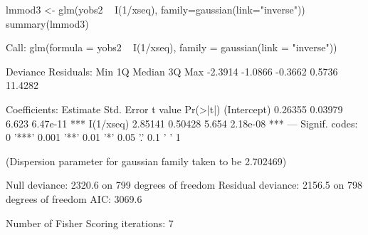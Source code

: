 \begin{Schunk}
\begin{Sinput}
 lmmod3 <- glm(yobs2 ~ I(1/xseq), family=gaussian(link="inverse"))
 summary(lmmod3)
\end{Sinput}
\begin{Soutput}
Call:
glm(formula = yobs2 ~ I(1/xseq), family = gaussian(link = "inverse"))

Deviance Residuals: 
    Min       1Q   Median       3Q      Max  
-2.3914  -1.0866  -0.3662   0.5736  11.4282  

Coefficients:
            Estimate Std. Error t value Pr(>|t|)    
(Intercept)  0.26355    0.03979   6.623 6.47e-11 ***
I(1/xseq)    2.85141    0.50428   5.654 2.18e-08 ***
---
Signif. codes:  0 '***' 0.001 '**' 0.01 '*' 0.05 '.' 0.1 ' ' 1

(Dispersion parameter for gaussian family taken to be 2.702469)

    Null deviance: 2320.6  on 799  degrees of freedom
Residual deviance: 2156.5  on 798  degrees of freedom
AIC: 3069.6

Number of Fisher Scoring iterations: 7
\end{Soutput}
\begin{Sinput}
 
\end{Sinput}
\end{Schunk}
